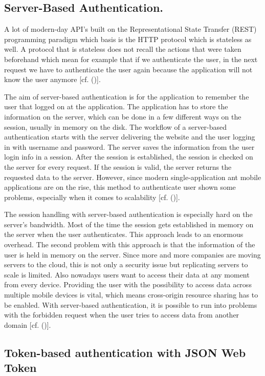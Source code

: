\subsection{Server-Based Authentication.}
A lot of modern-day API’s built on the Representational State Transfer (REST) programming paradigm which basis is the HTTP protocol which is stateless as well. A protocol that is stateless does not recall the actions that were taken beforehand which mean for example that if we authenticate the user, in the next request we have to authenticate the user again because the application will not know the user anymore [cf. (\cite{Serilleja:2015:Scothio})]. 

The aim of server-based authentication is for the application to remember the user that logged on at the application. The application has to store the information on the server, which can be done in a few different ways on the session, usually in memory on the disk. The workflow of a server-based authentication starts with the server delivering the website and the user logging in with username and password. The server saves the information from the user login info in a session. After the session is established, the session is checked on the server for every request. If the session is valid, the server returns the requested data to the server. However, since modern single-application ant mobile applications are on the rise, this method to authenticate user shown some problems, especially when it comes to scalability [cf. (\cite{Serilleja:2015:Scothio})]. 

The session handling with server-based authentication is especially hard on the server’s bandwidth. Most of the time the session gets established in memory on the server when the user authenticates. This approach leads to an enormous overhead. The second problem with this approach is that the information of the user is held in memory on the server. Since more and more companies are moving servers to the cloud, this is not only a security issue but replicating servers to scale is limited. Also nowadays users want to access their data at any moment from every device. Providing the user with the possibility to access data across multiple mobile devices is vital, which means cross-origin resource sharing has to be enabled. With server-based authentication, it is possible to run into problems with the forbidden request when the user tries to access data from another domain [cf. (\cite{Serilleja:2015:Scothio})].


\subsection{
	Token-based authentication with JSON Web Token
}

